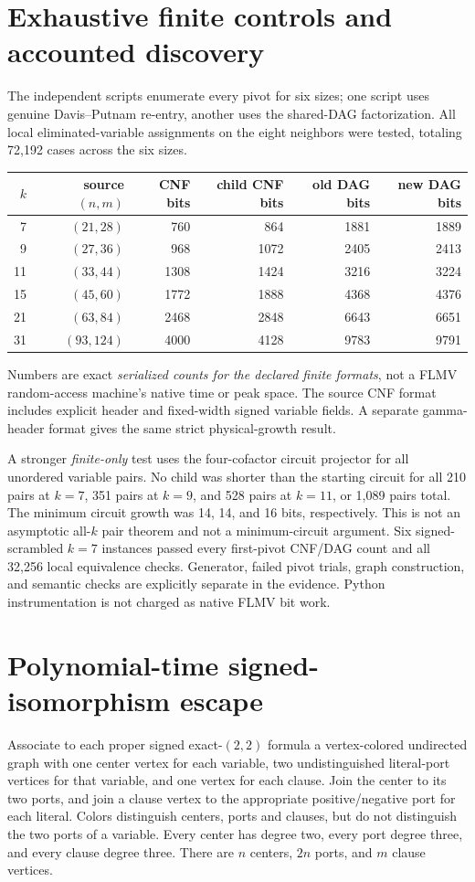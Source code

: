\documentclass[11pt]{article}
\begin{document}
\section{Exhaustive finite controls and accounted discovery}
The independent scripts enumerate every pivot for six sizes; one script
uses genuine Davis--Putnam re-entry, another uses the shared-DAG
factorization. All local eliminated-variable assignments on the eight
neighbors were tested, totaling 72,192 cases across the six sizes.
\begin{center}\small
\begin{tabular}{rrrrrr}
\toprule
$k$ & source $(n,m)$ & CNF bits & child CNF bits & old DAG bits & new DAG bits\\
\midrule
7 & $(21,28)$ & 760 & 864 & 1881 & 1889\\
9 & $(27,36)$ & 968 & 1072 & 2405 & 2413\\
11 & $(33,44)$ & 1308 & 1424 & 3216 & 3224\\
15 & $(45,60)$ & 1772 & 1888 & 4368 & 4376\\
21 & $(63,84)$ & 2468 & 2848 & 6643 & 6651\\
31 & $(93,124)$ & 4000 & 4128 & 9783 & 9791\\
\bottomrule
\end{tabular}
\end{center}
Numbers are exact \emph{serialized counts for the declared finite formats},
not a FLMV random-access machine's native time or peak space. The source
CNF format includes explicit header and fixed-width signed variable fields.
A separate gamma-header format gives the same strict physical-growth result.

A stronger \emph{finite-only} test uses the four-cofactor circuit projector
for all unordered variable pairs. No child was shorter than the starting
circuit for all 210 pairs at $k=7$, 351 pairs at $k=9$, and 528 pairs at
$k=11$, or 1,089 pairs total. The minimum circuit growth was 14, 14,
and 16 bits, respectively. This is not an asymptotic all-$k$ pair theorem
and not a minimum-circuit argument. Six signed-scrambled $k=7$ instances
passed every first-pivot CNF/DAG count and all 32,256 local equivalence
checks. Generator, failed pivot trials, graph construction, and semantic
checks are explicitly separate in the evidence. Python instrumentation is
not charged as native FLMV bit work.

\section{Polynomial-time signed-isomorphism escape}
Associate to each proper signed exact-$(2,2)$ formula a vertex-colored
undirected graph with one center vertex for each variable, two undistinguished
literal-port vertices for that variable, and one vertex for each clause.
Join the center to its two ports, and join a clause vertex to the appropriate
positive/negative port for each literal. Colors distinguish centers,
ports and clauses, but do not distinguish the two ports of a variable.
Every center has degree two, every port degree three, and every clause
degree three. There are $n$ centers, $2n$ ports, and $m$ clause vertices.
\end{document}
